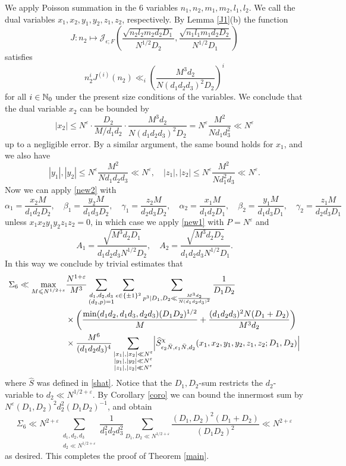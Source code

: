 \documentclass[11pt]{amsart}
\theoremstyle{plain}
\numberwithin{equation}{section}
\theoremstyle{definition}
\renewcommand{\leq}{\leqslant}
\begin{document}
We apply Poisson summation in the 6 variables $n_1, n_2, m_1, m_2, l_1, l_2$.  We call the dual variables $x_1, x_2, y_1, y_2, z_1, z_2$, respectively. By Lemma \ref{J1}(b) the function 
$$J : n_2 \mapsto \mathcal{J}_{\epsilon; F} \left(\frac{\sqrt{n_2l_2m_2d_2D_1}}{ N^{1/2} D_2}, \frac{\sqrt{n_1l_1m_1d_2D_2} }{ N^{1/2} D_1}\right)$$
satisfies
$$n_2^iJ^{(i)}(n_2) \ll_i \left(\frac{M^3d_2}{N (d_1 d_2d_3)^2 D_2}\right)^i$$
for all $i \in \Bbb{N}_0$ under the present size conditions of the variables. We conclude that the dual variable $x_2$ can be bounded by
$$|x_2| \leq N^{\varepsilon} \cdot  \frac{D_2}{M/d_1d_2}\cdot  \frac{M^3d_2}{N (d_1 d_2d_3)^2 D_2} = N^{\varepsilon} \frac{M^2 }{N  d_1d_3^2} \ll N^{\varepsilon}$$
up to a negligible error. By a similar argument, the same bound holds for $x_1$, and we also have
$$|y_1|, |y_2| \leq N^{\varepsilon} \frac{M^2}{N d_1d_2d_3} \ll N^{\varepsilon}, \quad |z_1|, |z_2| \leq N^{\varepsilon} \frac{M^2}{N d_1^2d_3} \ll N^{\varepsilon}.$$
Now we can apply \eqref{new2} with 
$$\alpha_1 = \frac{x_2M}{d_1d_2D_2}, \quad  \beta_1 = \frac{y_2M}{d_1d_3D_2}, \quad \gamma_1 = \frac{z_2M}{d_2d_3D_2}, \quad \alpha_2 = \frac{x_1M}{d_1d_2D_1}, \quad  \beta_2 = \frac{y_1M}{d_1d_3D_1}, \quad \gamma_2 = \frac{z_1M}{d_2d_3D_1}$$
unless   $x_1 x_2y_1y_2z_1z_2 = 0$, in which case we apply \eqref{new1} with $P  =  N^{\varepsilon}$ and 
$$A_1 = \frac{\sqrt{M^3 d_2 D_1}}{d_1d_2d_3N^{1/2}D_2}, \quad A_2 =\frac{\sqrt{M^3 d_2 D_2}}{d_1d_2d_3N^{1/2}D_1} .$$
 In this way we conclude by trivial estimates that 
\begin{displaymath}
\begin{split}
\Sigma_6  \ll \max_{M \leq N^{1/2+\varepsilon}}& \frac{N^{1+\varepsilon}}{M^3}  \sum_{\substack{d_1, d_2, d_3\\ (d_2, p) = 1}} \sum_{\epsilon \in \{\pm 1\}^2} \sum_{p^3 \mid D_1, D_2 \ll \frac{M^3d_2}{N(d_1d_2d_3)^2}} \frac{1}{D_1D_2} \\
& \times  \left(\frac{\min(d_1d_2, d_1d_3, d_2d_3)(D_1D_2)^{1/2}}{M}+\frac{(d_1d_2d_3)^2N(D_1+D_2) }{M^3d_2}\right) \\
&\times \frac{M^6}{(d_1d_2d_3)^4} \sum_{\substack{|x_1|, |x_2| \ll N^{\varepsilon}\\ |y_1|, |y_2| \ll N^{\varepsilon} \\ |z_1|, |z_2| \ll N^{\varepsilon}}} \Bigl|\widehat{S}^{\chi}_{\epsilon_2 \bar{N}, \epsilon_1\bar{N}, d_2}(x_1, x_2, y_1, y_2, z_1, z_2; D_1, D_2)\Bigr|
\end{split}
\end{displaymath}
where $\widehat{S}$ was defined in  \eqref{shat}.  Notice that the $D_1, D_2$-sum restricts the $d_2$-variable to $d_2 \ll N^{1/2+\varepsilon}$. By Corollary \ref{coro} we can bound the innermost sum by $N^{\varepsilon}(D_1, D_2)^{2} d_2^2 (D_1D_2)^{-1}$, and
 obtain
 $$\Sigma_6  \ll  N^{2+\varepsilon} \sum_{\substack{d_1, d_2, d_3\\ d_2 \ll N^{1/2+\varepsilon}}}  \frac{1}{d_1^2d_2d_3^2}\sum_{D_1, D_2 \ll  N^{1/2 + \varepsilon} } \frac{(D_1, D_2)^2(D_1+D_2)}{(D_1D_2)^2 } \ll N^{2+\varepsilon}$$
as desired. This completes the proof of Theorem \ref{main}.  
 
\end{document}
